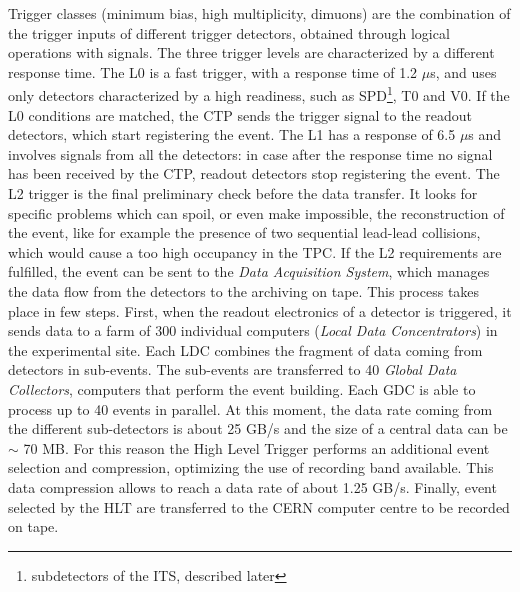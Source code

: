Trigger classes (minimum bias, high multiplicity, dimuons) are the combination of the trigger inputs of different trigger detectors, obtained through logical operations with signals. The three trigger levels are characterized by a different response time. The L0 is a fast trigger, with a response time of 1.2 $\mu$s, and uses only detectors characterized by a high readiness, such as SPD\footnote{subdetectors of the ITS, described later}, T0 and V0. If the L0 conditions are matched, the CTP sends the trigger signal to the readout detectors, which start registering the event. The L1 has a response of 6.5 $\mu$s and involves signals from all the detectors: in case after the response time no signal has been received by the CTP, readout detectors stop registering the event. The L2 trigger is the final preliminary check before the data transfer. It looks for specific problems which can spoil, or even make impossible, the reconstruction of the event, like for example the presence of two sequential lead-lead collisions, which would cause a too high occupancy in the TPC. If the L2 requirements are fulfilled, the event can be sent to the \textit{Data Acquisition System}, which manages the data flow from the detectors to the archiving on tape. This process takes place in few steps. First, when the readout electronics of a detector is triggered, it sends data to a farm of 300 individual computers (\textit{Local Data Concentrators}) in the experimental site. Each LDC combines the fragment of data coming from detectors in sub-events. The sub-events are transferred to 40 \textit{Global Data Collectors}, computers that perform the event building. Each GDC is able to process up to 40 events in parallel. At this moment, the data rate coming from the different sub-detectors is about 25 GB/s and the size of a central data can be $\sim$ 70 MB. For this reason the High Level Trigger performs an additional event selection and compression, optimizing the use of recording band available. This data compression allows to reach a data rate of about 1.25 GB/s. Finally, event selected by the HLT are transferred to the CERN computer centre to be recorded on tape.

